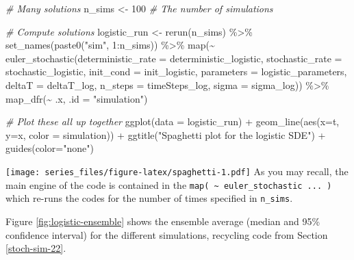 \documentclass[
]{book}
\newenvironment{Shaded}{\begin{snugshade}}{\end{snugshade}}
\newcommand{\AttributeTok}[1]{\textcolor[rgb]{0.77,0.63,0.00}{#1}}
\newcommand{\CommentTok}[1]{\textcolor[rgb]{0.56,0.35,0.01}{\textit{#1}}}
\newcommand{\DecValTok}[1]{\textcolor[rgb]{0.00,0.00,0.81}{#1}}
\newcommand{\FunctionTok}[1]{\textcolor[rgb]{0.00,0.00,0.00}{#1}}
\newcommand{\NormalTok}[1]{#1}
\newcommand{\OtherTok}[1]{\textcolor[rgb]{0.56,0.35,0.01}{#1}}
\newcommand{\SpecialCharTok}[1]{\textcolor[rgb]{0.00,0.00,0.00}{#1}}
\newcommand{\StringTok}[1]{\textcolor[rgb]{0.31,0.60,0.02}{#1}}
\theoremstyle{definition}
\theoremstyle{definition}
\theoremstyle{definition}
\theoremstyle{remark}
\begin{document}
\begin{Shaded}
\begin{Highlighting}[]
\CommentTok{\# Many solutions}
\NormalTok{n\_sims }\OtherTok{\textless{}{-}} \DecValTok{100}  \CommentTok{\# The number of simulations}

\CommentTok{\# Compute solutions}
\NormalTok{logistic\_run }\OtherTok{\textless{}{-}} \FunctionTok{rerun}\NormalTok{(n\_sims) }\SpecialCharTok{\%\textgreater{}\%}
  \FunctionTok{set\_names}\NormalTok{(}\FunctionTok{paste0}\NormalTok{(}\StringTok{"sim"}\NormalTok{, }\DecValTok{1}\SpecialCharTok{:}\NormalTok{n\_sims)) }\SpecialCharTok{\%\textgreater{}\%}
  \FunctionTok{map}\NormalTok{(}\SpecialCharTok{\textasciitilde{}} \FunctionTok{euler\_stochastic}\NormalTok{(}\AttributeTok{deterministic\_rate =}\NormalTok{ deterministic\_logistic,}
                             \AttributeTok{stochastic\_rate =}\NormalTok{ stochastic\_logistic,}
                             \AttributeTok{init\_cond =}\NormalTok{ init\_logistic,}
                             \AttributeTok{parameters =}\NormalTok{ logistic\_parameters,}
                             \AttributeTok{deltaT =}\NormalTok{ deltaT\_log,}
                             \AttributeTok{n\_steps =}\NormalTok{ timeSteps\_log,}
                             \AttributeTok{sigma =}\NormalTok{ sigma\_log)) }\SpecialCharTok{\%\textgreater{}\%}
  \FunctionTok{map\_dfr}\NormalTok{(}\SpecialCharTok{\textasciitilde{}}\NormalTok{ .x, }\AttributeTok{.id =} \StringTok{"simulation"}\NormalTok{)}


\CommentTok{\# Plot these all up together}
  \FunctionTok{ggplot}\NormalTok{(}\AttributeTok{data =}\NormalTok{ logistic\_run) }\SpecialCharTok{+}
  \FunctionTok{geom\_line}\NormalTok{(}\FunctionTok{aes}\NormalTok{(}\AttributeTok{x=}\NormalTok{t, }\AttributeTok{y=}\NormalTok{x, }\AttributeTok{color =}\NormalTok{ simulation)) }\SpecialCharTok{+}
  \FunctionTok{ggtitle}\NormalTok{(}\StringTok{"Spaghetti plot for the logistic SDE"}\NormalTok{) }\SpecialCharTok{+}
  \FunctionTok{guides}\NormalTok{(}\AttributeTok{color=}\StringTok{"none"}\NormalTok{)}
\end{Highlighting}
\end{Shaded}

\texttt{[image: series\_files/figure-latex/spaghetti-1.pdf]}
As you may recall, the main engine of the code is contained in the \texttt{map(\ \textasciitilde{}\ euler\_stochastic\ ...\ )} which re-runs the codes for the number of times specified in \texttt{n\_sims}.

Figure \ref{fig:logistic-ensemble} shows the ensemble average (median and 95\% confidence interval) for the different simulations, recycling code from Section \ref{stoch-sim-22}.
\end{document}
